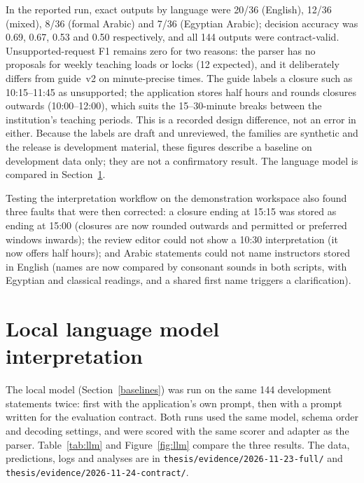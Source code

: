 In the reported run, exact outputs by language were 20/36 (English), 12/36 (mixed), 8/36 (formal Arabic) and 7/36 (Egyptian Arabic); decision accuracy was 0.69, 0.67, 0.53 and 0.50 respectively, and all 144 outputs were contract-valid. Unsupported-request F1 remains zero for two reasons: the parser has no proposals for weekly teaching loads or locks (12 expected), and it deliberately differs from guide~v2 on minute-precise times. The guide labels a closure such as 10:15--11:45 as unsupported; the application stores half hours and rounds closures outwards (10:00--12:00), which suits the 15--30-minute breaks between the institution's teaching periods. This is a recorded design difference, not an error in either. Because the labels are draft and unreviewed, the families are synthetic and the release is development material, these figures describe a baseline on development data only; they are not a confirmatory result. The language model is compared in Section~\ref{evidence-llm}.

Testing the interpretation workflow on the demonstration workspace also found three faults that were then corrected: a closure ending at 15:15 was stored as ending at 15:00 (closures are now rounded outwards and permitted or preferred windows inwards); the review editor could not show a 10:30 interpretation (it now offers half hours); and Arabic statements could not name instructors stored in English (names are now compared by consonant sounds in both scripts, with Egyptian and classical readings, and a shared first name triggers a clarification).

\section{Local language model interpretation}\label{evidence-llm}
The local model (Section~\ref{baselines}) was run on the same 144 development statements twice: first with the application's own prompt, then with a prompt written for the evaluation contract. Both runs used the same model, schema order and decoding settings, and were scored with the same scorer and adapter as the parser. Table~\ref{tab:llm} and Figure~\ref{fig:llm} compare the three results. The data, predictions, logs and analyses are in \texttt{thesis/evidence/2026-11-23-full/} and \texttt{thesis/evidence/2026-11-24-contract/}.

